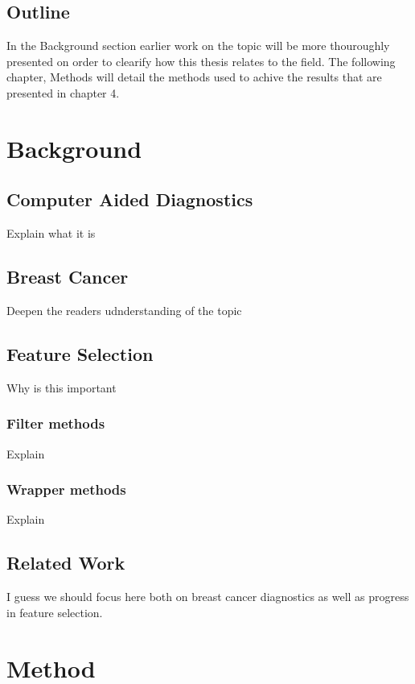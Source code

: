 \documentclass{kththesis}
\begin{document}
\section{Outline}

In the Background section earlier work on the topic will be more thouroughly presented on order to clearify how this thesis relates to the field. The following chapter, Methods will detail the methods used to achive the results that are presented in chapter 4.

\chapter{Background}

\section{Computer Aided Diagnostics}

Explain what it is

\section{Breast Cancer}

Deepen the readers udnderstanding of the topic

\section{Feature Selection}

Why is this important

\subsection{Filter methods}

Explain

\subsection{Wrapper methods}

Explain

\section{Related Work}

I guess we should focus here both on breast cancer diagnostics as well as progress in feature selection.

\chapter{Method}
\end{document}

